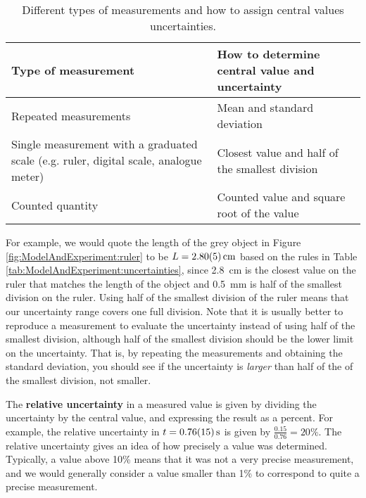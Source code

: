 \begin{table}[!h]
\centering
\begin{tabular}{p{3in}p{3in}} 
\textbf{Type of measurement} &\textbf{How to determine central value and uncertainty} \\
\hline
\hline
Repeated measurements & Mean and standard deviation \\ \hline
Single measurement with a graduated scale (e.g. ruler, digital scale, analogue meter) & Closest value and half of the smallest division\\ \hline
Counted quantity & Counted value and square root of the value \\ \hline
\end{tabular}
\caption{\label{tab:chap2:uncertainties} Different types of measurements and how to assign central values uncertainties.}
\end{table}
For example, we would quote the length of the grey object in Figure \ref{fig:ModelAndExperiment:ruler} to be $L=\SI{2.8\pm0.05}{cm}$ based on the rules in Table \ref{tab:ModelAndExperiment:uncertainties}, since \SI{2.8}{cm} is the closest value on the ruler that matches the length of the object and \SI{0.5}{mm} is half of the smallest division on the ruler. Using half of the smallest division of the ruler means that our uncertainty range covers one full division. Note that it is usually better to reproduce a measurement to evaluate the uncertainty instead of using half of the smallest division, although half of the smallest division should be the lower limit on the uncertainty. That is, by repeating the measurements and obtaining the standard deviation, you should see if the uncertainty is \textit{larger} than half of the of the smallest division, not smaller.


The \textbf{relative uncertainty} in a measured value is given by dividing the uncertainty by the central value, and expressing the result as a percent. For example, the relative uncertainty in $t=\SI{0.76\pm 0.15}{s}$ is given by $\frac{0.15}{0.76}=20\%$. The relative uncertainty gives an idea of how precisely a value was determined. Typically, a value above 10\% means that it was not a very precise measurement, and we would generally consider a value smaller than 1\% to correspond to quite a precise measurement. 


